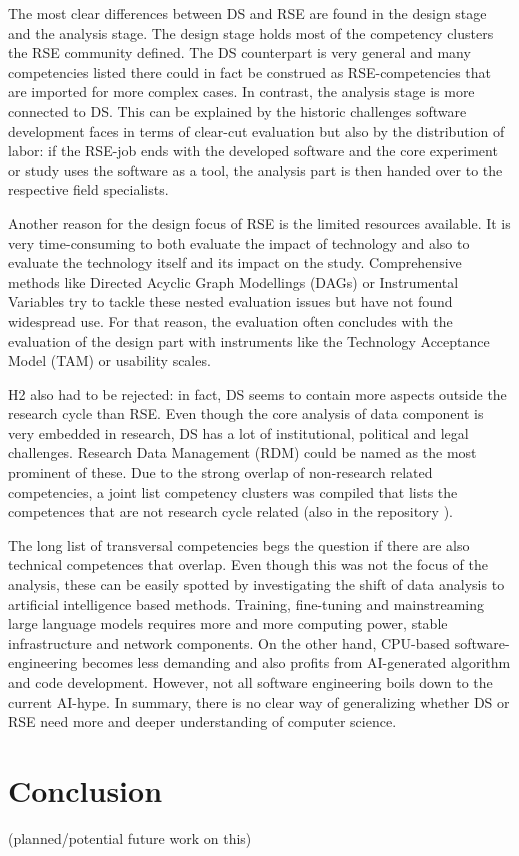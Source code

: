 \documentclass[
        english,biblatex
    ]{lni}
\begin{document}
    The most clear differences between DS and RSE are found in the
    design stage and the analysis stage. The design stage holds most of
    the competency clusters the RSE community defined. The DS
    counterpart is very general and many competencies listed there could
    in fact be construed as RSE-competencies that are imported for more
    complex cases. In contrast, the analysis stage is more connected to
    DS. This can be explained by the historic challenges software
    development faces in terms of clear-cut evaluation but also by the
    distribution of labor: if the RSE-job ends with the developed
    software and the core experiment or study uses the software as a
    tool, the analysis part is then handed over to the respective field
    specialists.

    Another reason for the design focus of RSE is the limited resources
    available. It is very time-consuming to both evaluate the impact of
    technology and also to evaluate the technology itself and its impact
    on the study. Comprehensive methods like Directed Acyclic Graph
    Modellings (DAGs) or Instrumental Variables try to tackle these
    nested evaluation issues but have not found widespread use. For that
    reason, the evaluation often concludes with the evaluation of the
    design part with instruments like the Technology Acceptance Model
    (TAM) or usability scales.

    H2 also had to be rejected: in fact, DS seems to contain more
    aspects outside the research cycle than RSE. Even though the core
    analysis of data component is very embedded in research, DS has a
    lot of institutional, political and legal challenges. Research Data
    Management (RDM) could be named as the most prominent of these. Due
    to the strong overlap of non-research related competencies, a joint
    list competency clusters was compiled that lists the competences
    that are not research cycle related (also in the repository
    \autocite{ds2rse2025}).

    The long list of transversal competencies begs the question if there
    are also technical competences that overlap. Even though this was
    not the focus of the analysis, these can be easily spotted by
    investigating the shift of data analysis to artificial intelligence
    based methods. Training, fine-tuning and mainstreaming large
    language models requires more and more computing power, stable
    infrastructure and network components. On the other hand, CPU-based
    software-engineering becomes less demanding and also profits from
    AI-generated algorithm and code development. However, not all
    software engineering boils down to the current AI-hype. In summary,
    there is no clear way of generalizing whether DS or RSE need more
    and deeper understanding of computer science.

    \section{Conclusion}\label{conclusion}

    (planned/potential future work on this)

    \printbibliography

\end{document}
